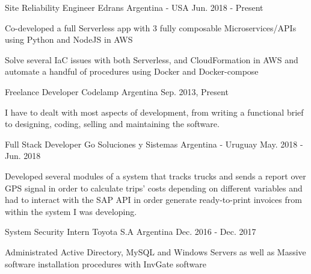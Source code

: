

\begin{cventries}
\cventry
{Site Reliability Engineer} %
{Edrans} %
{Argentina - USA} %
{Jun. 2018 - Present} %
{
\begin{cvitems} %
\item {Co-developed a full Serverless app with 3 fully composable Microservices/APIs using Python and NodeJS in AWS}
\item {Solve several IaC issues with both Serverless, and CloudFormation in AWS and automate a handful of procedures using Docker and Docker-compose}
\end{cvitems}
}

\cventry
{Freelance Developer} %
{Codelamp} %
{Argentina} %
{Sep. 2013, Present} %
{
\begin{cvitems}
    \item {I have to dealt with most aspects of development, from writing a functional brief to designing, coding, selling and maintaining the software.}
\end{cvitems}
}

\cventry
{Full Stack Developer} %
{Go Soluciones y Sistemas} %
{Argentina - Uruguay} %
{May. 2018 - Jun. 2018} %
{
\begin{cvitems} %
\item {Developed several modules of a system that tracks trucks and sends a report over GPS signal in order to calculate trips' costs depending on different variables and had to interact with the SAP API in order generate ready-to-print invoices from within the system I was developing.}
\end{cvitems}
}

\cventry
{System Security Intern} %
{Toyota S.A} %
{Argentina} %
{Dec. 2016 - Dec. 2017} %
{
\begin{cvitems} %
\item {Administrated Active Directory, MySQL and Windows Servers as well as Massive software installation procedures with InvGate software}
\end{cvitems}
}
\end{cventries}
